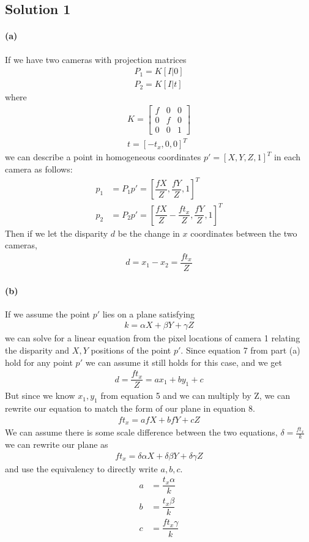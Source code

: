 \documentclass{article}
\newcommand{\solution}[1]{\clearpage \subsection*{Solution #1}}
\newcommand{\spart}[1]{\paragraph{(#1)}}
\begin{document}

\solution{1} 

\spart{a} If we have two cameras with projection matrices 
\begin{align}
	P_1 = K[I|0] \\
	P_2 = K[I|t] 
\end{align}
where 
\begin{align}
	K = \begin{bmatrix}
			f & 0 & 0 \\ 
			0 & f & 0\\
			0 & 0 & 1
		\end{bmatrix} \\
	t = [-t_x, 0, 0]^T
\end{align}
we can describe a point in homogeneous coordinates $p' = [X,Y,Z,1]^T$ in each camera as follows:
\begin{align}
	p_1 & = P_1 p' = \left[\dfrac{fX}{Z}, \dfrac{fY}{Z}, 1\right]^T\\
	p_2 &= P_2 p' = \left[\dfrac{fX}{Z}-\dfrac{ft_x}{Z}, \dfrac{fY}{Z}, 1\right]^T
\end{align}
Then if we let the disparity $d$ be the change in $x$ coordinates between the two cameras,
\begin{align}
	d = x_1-x_2 = \dfrac{ft_x}{Z}
\end{align}

\spart{b} If we assume the point $p'$ lies on a plane satisfying 
\begin{align}
	k = \alpha X + \beta Y + \gamma Z 
\end{align}
we can solve for a linear equation from the pixel locations of camera 1 relating the disparity and $X,Y$ positions of the point $p'$. Since equation 7 from part (a) hold for any point $p'$ we can assume it still holds for this case, and we get 
\begin{align}
	d = \dfrac{ft_x}{Z} = ax_1 + by_1 + c
\end{align}
But since we know $x_1,y_1$ from equation 5 and we can multiply by Z, we can rewrite our equation to match the form of our plane in equation 8.
\begin{align}
	ft_x = afX + bfY + cZ
\end{align}
We can assume there is some scale difference between the two equations, $\delta = \frac{ft_x}{k}$ we can rewrite our plane as
\begin{align}
	ft_x = \delta \alpha X + \delta\beta Y + \delta\gamma Z 
\end{align}
and use the equivalency to directly write $a,b,c$.
\begin{align}
	a &= \dfrac{t_x\alpha}{k} \\
	b &= \dfrac{t_x\beta}{k} \\
	c &= \dfrac{ft_x\gamma}{k}
\end{align}
\end{document}
